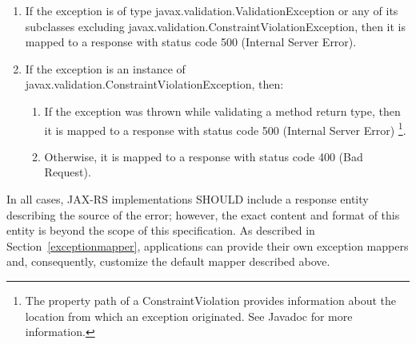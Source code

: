 \begin{enumerate}
    \item If the exception is of type javax.validation.ValidationException or any of its subclasses
    excluding javax.validation.ConstraintViolationException, then it is mapped to a response with status code 500
    (Internal Server Error).
    \item If the exception is an instance of javax.validation.ConstraintViolationException, then:
    \begin{enumerate}
        \item If the exception was thrown while validating a method return type, then it is mapped to a response with
        status code 500 (Internal Server Error) \footnote{The property path of a ConstraintViolation provides
        information about the location from which an exception originated. See Javadoc for more information.}.
        \item Otherwise, it is mapped to a response with status code 400 (Bad Request).
    \end{enumerate}
\end{enumerate}

In all cases, JAX-RS implementations SHOULD include a response entity describing the source of the error; however, the
exact content and format of this entity is beyond the scope of this specification. As described in
Section~\ref{exceptionmapper}, applications can provide their own exception mappers and, consequently, customize the
default mapper described above.
